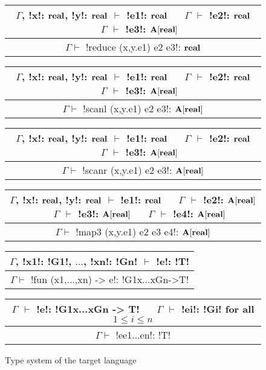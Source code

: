 \begin{figure*}[tb]
    \centering

    \begin{tabular}{c}
        $\Gamma$, !x!: $\mathbf{real}$, !y!: $\mathbf{real}$ $\vdash$ !e1!: $\mathbf{real}$ 
        $\quad$ $\Gamma$ $\vdash$ !e2!: $\mathbf{real}$
        $\quad$ $\Gamma$ $\vdash$ !e3!: $\mathbf{A}[\mathbf{real}]$
        \\\hline  
        $\Gamma \vdash$ !reduce (x,y.e1) e2 e3!: $\mathbf{real}$
    \end{tabular}

    \begin{tabular}{c}
        $\Gamma$, !x!: $\mathbf{real}$, !y!: $\mathbf{real}$ $\vdash$ !e1!: $\mathbf{real}$ 
        $\quad$ $\Gamma$ $\vdash$ !e2!: $\mathbf{real}$
        $\quad$ $\Gamma$ $\vdash$ !e3!: $\mathbf{A}[\mathbf{real}]$
        \\\hline  
        $\Gamma \vdash$ !scanl (x,y.e1) e2 e3!: $\mathbf{A}[\mathbf{real}]$
    \end{tabular}

    \begin{tabular}{c}
        $\Gamma$, !x!: $\mathbf{real}$, !y!: $\mathbf{real}$ $\vdash$ !e1!: $\mathbf{real}$ 
        $\quad$ $\Gamma$ $\vdash$ !e2!: $\mathbf{real}$
        $\quad$ $\Gamma$ $\vdash$ !e3!: $\mathbf{A}[\mathbf{real}]$
        \\\hline  
        $\Gamma \vdash$ !scanr (x,y.e1) e2 e3!: $\mathbf{A}[\mathbf{real}]$
    \end{tabular}

    \begin{tabular}{c}
        $\Gamma$, !x!: $\mathbf{real}$, !y!: $\mathbf{real}$ $\vdash$ !e1!: $\mathbf{real}$ 
        $\quad$ $\Gamma$ $\vdash$ !e2!: $\mathbf{A}[\mathbf{real}]$
        $\quad$ $\Gamma$ $\vdash$ !e3!: $\mathbf{A}[\mathbf{real}]$
        $\quad$ $\Gamma$ $\vdash$ !e4!: $\mathbf{A}[\mathbf{real}]$
        \\\hline  
        $\Gamma \vdash$ !map3 (x,y.e1) e2 e3 e4!: $\mathbf{A}[\mathbf{real}]$
    \end{tabular}

    \begin{tabular}{c}
        $\Gamma$, !x1!: !G1!, $\ldots$, !xn!: !Gn! $\vdash$ !e!: !T! 
        \\\hline  
        $\Gamma \vdash$ !fun (x1,...,xn) -> e!: !G1x...xGn->T!
    \end{tabular}

    \begin{tabular}{c}
        $\Gamma$ $\vdash$ !e!: !G1x...xGn -> T!
        $\quad$ $\Gamma$ $\vdash$ !ei!: !Gi! for all $1\leq i\leq n$
        \\\hline  
        $\Gamma \vdash$ !ee1...en!: !T!
    \end{tabular}

    \vspace{-0.2cm}
    \caption{Type system of the target language}
    \vspace{-0.4cm}
    \label{fig:target_typesystem}
    \end{figure*}    
